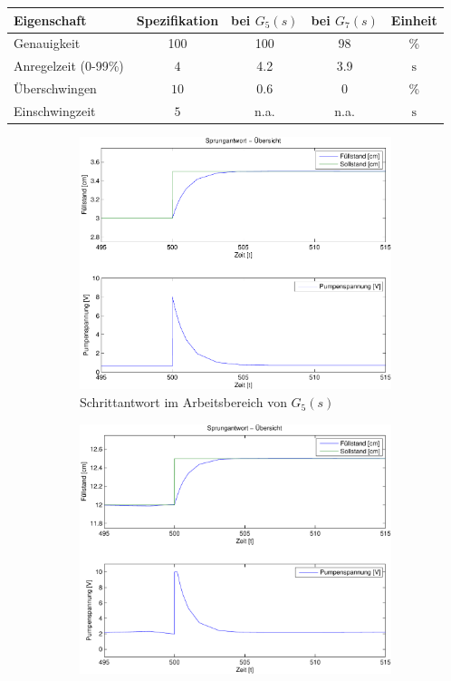 \begin{table}[h!]
	\centering
	\begin{tabular}{l c c c c}
		Eigenschaft
			& Spezifikation
			& bei $G_5(s)$
			& bei $G_7(s)$
			& Einheit \\
		\hline
		Genauigkeit
			& 100
			& 100
			& 98 
			& \% \\
		Anregelzeit (0-99\%)
			& $4$
			& 4.2
			& 3.9
			& $\si{\second}$ \\
		Überschwingen
			& $10$
			& 0.6
			& 0
			& \% \\
		Einschwingzeit
			& $5$
			& n.a. 
			& n.a.
			& $\si{\second}$ \\
	\end{tabular}
\end{table}

\begin{figure}[h!]
	\centering
	\begin{subfigure}{0.475\textwidth}
		\includegraphics[width=1\textwidth]{11/L5_step_overview_plot.pdf}
		\caption{Schrittantwort im Arbeitsbereich von $G_5(s)$}
	\end{subfigure}
	\hfill{}
	\begin{subfigure}{0.475\textwidth}
		\includegraphics[width=1\textwidth]{11/L7_step_overview_plot.pdf}

\end{subfigure}
\end{figure}

